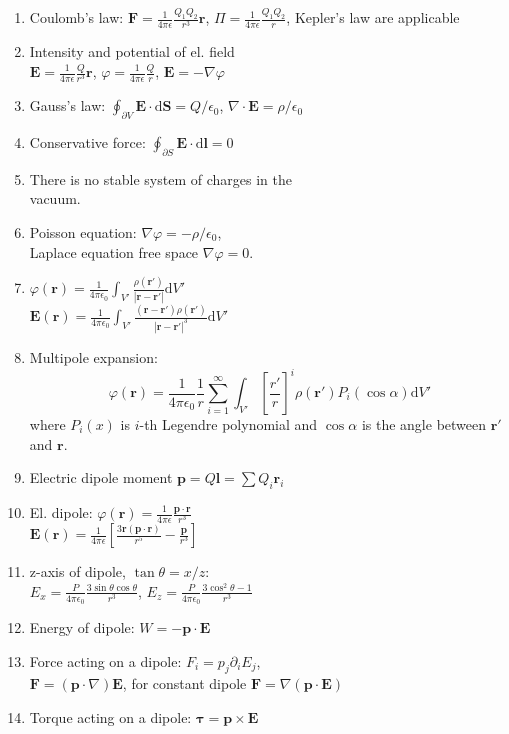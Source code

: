 \documentclass{article}
\renewcommand\d{\mathrm d}
\begin{document}
\begin{multicols}{3}
    \begin{enumerate}
        \item Coulomb's law: $\bm F=\frac{1}{4\pi\epsilon}\frac{Q_1Q_2}{r^3}\bm r$, $\Pi=\frac{1}{4\pi\epsilon}\frac{Q_1Q_2}{r}$, Kepler's law are applicable
        \item Intensity and potential of el. field\\ $\bm E=\frac{1}{4\pi\epsilon}\frac{Q}{r^3}\bm r$, $\varphi=\frac{1}{4\pi\epsilon}\frac{Q}{r}$, $\bm E=-\nabla\varphi$
        \item Gauss's law: $\oint_{\partial V}\bm E\cdot\d\bm S=Q/\epsilon_0$, $\nabla\cdot\bm E=\rho/\epsilon_0$
        \item Conservative force: $\oint_{\partial S}\bm E\cdot\d\bm l=0$
        \item There is no stable system of charges in the\\vacuum.
        \item Poisson equation: $\nabla\varphi=-\rho/\epsilon_0$,\\Laplace equation free space $\nabla\varphi=0$.
        \item $\varphi(\bm r)=\frac{1}{4\pi\epsilon_0}\int_{V'}\frac{\rho(\bm {r'})}{|\bm r-\bm{r'}|}\d V'$\\$\bm E(\bm r)=\frac{1}{4\pi\epsilon_0}\int_{V'}\frac{(\bm r-\bm{r'})\rho(\bm {r'})}{|\bm r-\bm{r'}|^3}\d V'$
        \item Multipole expansion: $$\varphi(\bm r)=\frac{1}{4\pi\epsilon_0}\frac{1}{r}\sum_{i=1}^\infty\int_{V'}\left[\frac{r'}{r}\right]^i\rho(\bm {r'})P_i(\cos\alpha)\d V'$$
        where $P_i(x)$ is $i$-th Legendre polynomial and $\cos\alpha$ is the angle between $\bm r'$ and $\bm r$.
        \item Electric dipole moment $\bm p=Q\bm l=\sum Q_i\bm r_i$
        \item El. dipole: $\varphi(\bm r)=\frac{1}{4\pi\epsilon}\frac{\bm p\cdot\bm r}{r^3}$\\$\bm E(\bm r)=\frac{1}{4\pi\epsilon}\left[\frac{3\bm r(\bm p\cdot\bm r)}{r^5}-\frac{\bm p}{r^3}\right]$
        \item z-axis of dipole, $\tan\theta=x/z$:\\ $E_x=\frac{P}{4\pi\epsilon_0}\frac{3\sin\theta\cos\theta}{r^3}$, $E_z=\frac{P}{4\pi\epsilon_0}\frac{3\cos^2\theta-1}{r^3}$
        \item Energy of dipole: $W=-\bm p\cdot\bm E$
        \item Force acting on a dipole: $F_i=p_j\partial_i E_j$,\\$\bm F=(\bm p\cdot\nabla)\bm E$, for constant dipole $\bm F=\nabla(\bm p\cdot\bm E)$
        \item Torque acting on a dipole: $\bm\tau=\bm p\times\bm E$
    \end{enumerate}



\end{multicols}
\end{document}
